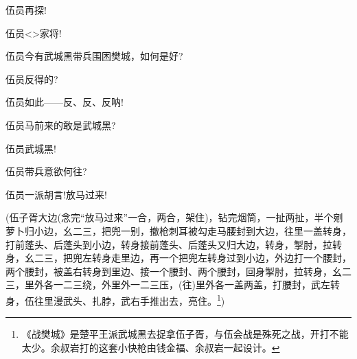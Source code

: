 {

伍员\hspace{30pt}再探!

伍员\hspace{30pt}\textless{}\!\textgreater{}家将!

伍员\hspace{30pt}今有武城黑带兵围困樊城，如何是好?

伍员\hspace{30pt}反得的?

伍员\hspace{30pt}如此------反、反、反呐!




\vspace{5pt}

伍员\hspace{30pt}马前来的敢是武城黑?

伍员\hspace{30pt}武城黑!

伍员\hspace{30pt}带兵意欲何往?

伍员\hspace{30pt}一派胡言!放马过来!

(伍子胥{\hwfs 大边}({\hwfs 念完}``{放马过来}''{\hwfs 一合}，{\hwfs 两合}，{\hwfs 架住})，{\hwfs 钻完烟筒}，{\hwfs 一扯两扯}，{\hwfs 半个剜萝卜归小边}，{\hwfs 幺二三}，{\hwfs 把兜一别}，{\hwfs 撤枪刺耳被勾走马腰封到大边}，{\hwfs 往里一盖转身}，{\hwfs 打前蓬头}、{\hwfs 后蓬头到小边}，{\hwfs 转身接前蓬头}、{\hwfs 后蓬头又归大边}，{\hwfs 转身}，{\hwfs 掣肘}，{\hwfs 拉转身}，{\hwfs 幺二三}，{\hwfs 把兜左转身走里边}，{\hwfs 再一个把兜左转身过到小边}，{\hwfs 外边打一个腰封}，{\hwfs 两个腰封}，{\hwfs 被盖右转身到里边}、{\hwfs 接一个腰封}、{\hwfs 两个腰封}，{\hwfs 回身掣肘}，{\hwfs 拉转身}，{\hwfs 幺二三}，{\hwfs 里外各一二三绕}，{\hwfs 外里外一二三压}，({\hwfs 往}){\hwfs 里外各一盖两盖}，{\hwfs 打腰封}，武{\hwfs 左转身}，伍{\hwfs 往里漫}武{\hwfs 头}、{\hwfs 扎脖}，武{\hwfs 右手推出去}，{\hwfs 亮住}。\footnote{ {《战樊城》是楚平王派武城黑去捉拿伍子胥}，{与伍会战是殊死之战}，{开打不能太少}。{余叔岩打的这套小快枪由钱金福、余叔岩一起设计。}})

}
